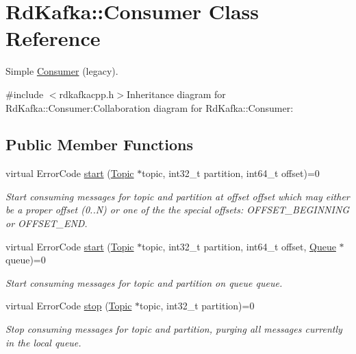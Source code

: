 \hypertarget{classRdKafka_1_1Consumer}{
\section{RdKafka::Consumer Class Reference}
\label{classRdKafka_1_1Consumer}
}


Simple \hyperlink{classRdKafka_1_1Consumer}{Consumer} (legacy).  


{\ttfamily \#include $<$rdkafkacpp.h$>$}Inheritance diagram for RdKafka::Consumer:Collaboration diagram for RdKafka::Consumer:\subsection*{Public Member Functions}
\begin{DoxyCompactItemize}
\item 
virtual ErrorCode \hyperlink{classRdKafka_1_1Consumer_ad2044e3433f626baff667e1a429d6f33}{start} (\hyperlink{classRdKafka_1_1Topic}{Topic} $\ast$topic, int32\_\-t partition, int64\_\-t offset)=0
\begin{DoxyCompactList}\small\item\em Start consuming messages for topic and {\ttfamily partition} at offset {\ttfamily offset} which may either be a proper offset (0..N) or one of the the special offsets: {\ttfamily OFFSET\_\-BEGINNING} or {\ttfamily OFFSET\_\-END}. \item\end{DoxyCompactList}\item 
virtual ErrorCode \hyperlink{classRdKafka_1_1Consumer_a096b4f201fef44fe4607a9b0b907a229}{start} (\hyperlink{classRdKafka_1_1Topic}{Topic} $\ast$topic, int32\_\-t partition, int64\_\-t offset, \hyperlink{classRdKafka_1_1Queue}{Queue} $\ast$queue)=0
\begin{DoxyCompactList}\small\item\em Start consuming messages for topic and {\ttfamily partition} on queue {\ttfamily queue}. \item\end{DoxyCompactList}\item 
virtual ErrorCode \hyperlink{classRdKafka_1_1Consumer_a123ce138ca526ee1e5fafff09f14602b}{stop} (\hyperlink{classRdKafka_1_1Topic}{Topic} $\ast$topic, int32\_\-t partition)=0
\begin{DoxyCompactList}\small\item\em Stop consuming messages for topic and {\ttfamily partition}, purging all messages currently in the local queue. \item\end{DoxyCompactList}\item 

\end{DoxyCompactItemize}

